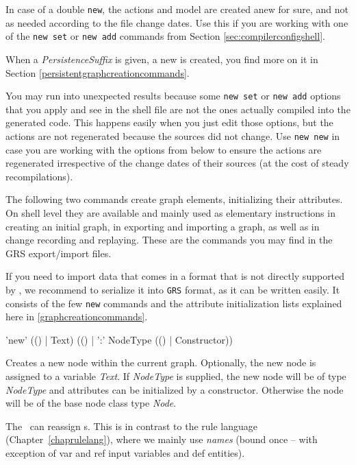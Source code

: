 In case of a double \texttt{new}, the actions and model are created anew for sure, and not as needed according to the file change dates.
Use this if you are working with one of the \texttt{new set} or \texttt{new add} commands from Section \ref{sec:compilerconfigshell}.

When a \emph{PersistenceSuffix} is given, a new  is created, you find more on it in Section \ref{persistentgraphcreationcommands}.

\begin{warning}
You may run into unexpected results because some \texttt{new set} or \texttt{new add} options that you apply and see in the shell file are not the ones actually compiled into the generated code.
This happens easily when you just edit those options, but the actions are not regenerated because the sources did not change.
Use \texttt{new new} in case you are working with the options from below to ensure the actions are regenerated irrespective of the change dates of their sources (at the cost of steady recompilations).
\end{warning}

The following two commands create graph elements, initializing their attributes.
On shell level they are available and mainly used as elementary instructions in creating an initial graph, in exporting and importing a graph, as well as in change recording and replaying.
These are the commands you may find in the GRS export/import files.


\begin{note}
If you need to import data that comes in a format that is not directly supported by \GrG,
we recommend to serialize it into \texttt{GRS} format,
as it can be written easily.
It consists of the few \texttt{new} commands and the attribute initialization lists explained here in \ref{graphcreationcommands}.
\end{note}

\begin{rail}
  'new' (() | Text) (() | ':' NodeType (() | Constructor))
\end{rail}
Creates a new node within the current graph.
Optionally, the new node is assigned to a variable \emph{Text}.
If \emph{NodeType} is supplied, the new node will be of type \emph{NodeType} and attributes can be initialized by a constructor.
Otherwise the node will be of the base node class type \emph{Node}.

\begin{note}
The \GrShell\ can reassign s.
This is in contrast to the rule language (Chapter~\ref{chaprulelang}), where we mainly use \emph{names}
(bound once -- with exception of var and ref input variables and def entities).
\end{note}

